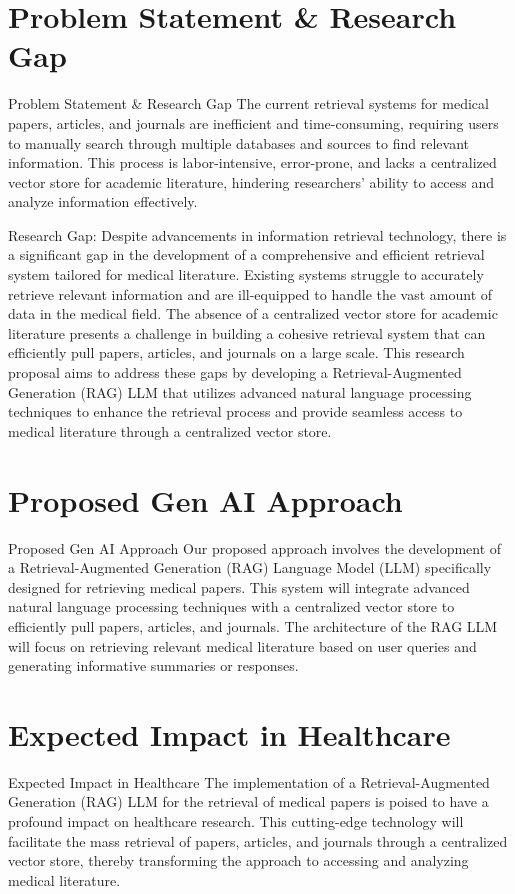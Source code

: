 \documentclass{beamer}
\begin{document}
\section{Problem Statement \& Research Gap}
\begin{frame}{Problem Statement \& Research Gap}
The current retrieval systems for medical papers, articles, and journals are inefficient and time-consuming, requiring users to manually search through multiple databases and sources to find relevant information. This process is labor-intensive, error-prone, and lacks a centralized vector store for academic literature, hindering researchers' ability to access and analyze information effectively.

Research Gap:
Despite advancements in information retrieval technology, there is a significant gap in the development of a comprehensive and efficient retrieval system tailored for medical literature. Existing systems struggle to accurately retrieve relevant information and are ill-equipped to handle the vast amount of data in the medical field. The absence of a centralized vector store for academic literature presents a challenge in building a cohesive retrieval system that can efficiently pull papers, articles, and journals on a large scale. This research proposal aims to address these gaps by developing a Retrieval-Augmented Generation (RAG) LLM that utilizes advanced natural language processing techniques to enhance the retrieval process and provide seamless access to medical literature through a centralized vector store.
\end{frame}

\section{Proposed Gen AI Approach}
\begin{frame}{Proposed Gen AI Approach}
Our proposed approach involves the development of a Retrieval-Augmented Generation (RAG) Language Model (LLM) specifically designed for retrieving medical papers. This system will integrate advanced natural language processing techniques with a centralized vector store to efficiently pull papers, articles, and journals. The architecture of the RAG LLM will focus on retrieving relevant medical literature based on user queries and generating informative summaries or responses.
\end{frame}

\section{Expected Impact in Healthcare}
\begin{frame}{Expected Impact in Healthcare}
The implementation of a Retrieval-Augmented Generation (RAG) LLM for the retrieval of medical papers is poised to have a profound impact on healthcare research. This cutting-edge technology will facilitate the mass retrieval of papers, articles, and journals through a centralized vector store, thereby transforming the approach to accessing and analyzing medical literature.
\end{frame}
\end{document}
